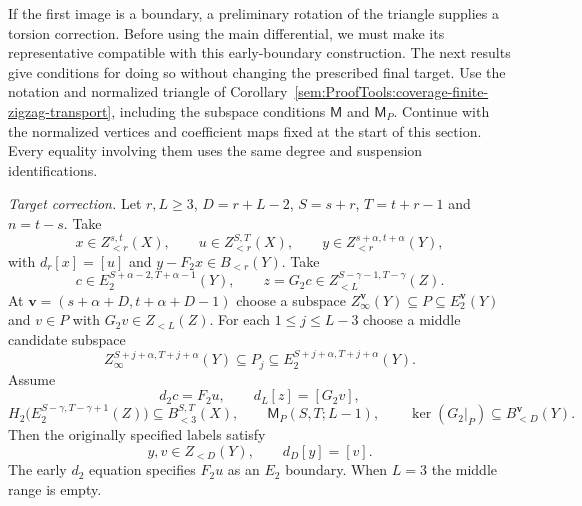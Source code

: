 If the first image is a boundary, a preliminary
rotation of the triangle supplies a torsion correction. Before using
the main differential, we must make its representative compatible
with this early-boundary construction. The next results give conditions
for doing so without changing the prescribed final target.
Use the notation and normalized triangle of
Corollary~\ref{sem:ProofTools:coverage-finite-zigzag-transport}, including
the subspace conditions $\mathsf M$ and $\mathsf M_P$.
Continue with the normalized vertices and coefficient maps fixed at
the start of this section. Every equality involving them uses the same
degree and suspension identifications.

\begin{corollary}
\label{sem:ProofTools:coverage-second-page-boundary-corrections}

\textit{Target correction.}
Let $r,L\ge3$, $D=r+L-2$, $S=s+r$, $T=t+r-1$ and $n=t-s$.
Take
\[
x\in Z_{<r}^{s,t}(X),\qquad u\in Z_{<r}^{S,T}(X),\qquad
 y\in Z_{<r}^{s+\alpha,t+\alpha}(Y),
\]
with $d_r[x]=[u]$ and $y-F_2x\in B_{<r}(Y)$.
Take
\[
c\in E_2^{S+\alpha-2,T+\alpha-1}(Y),\qquad
z=G_2c\in Z_{<L}^{S-\gamma-1,T-\gamma}(Z).
\]
At $\mathbf v=(s+\alpha+D,t+\alpha+D-1)$ choose a subspace
$Z_\infty^{\mathbf v}(Y)\subseteq P\subseteq E_2^{\mathbf v}(Y)$
and $v\in P$ with $G_2v\in Z_{<L}(Z)$. For each $1\le j\le L-3$
choose a middle candidate subspace
\[
Z_\infty^{S+j+\alpha,T+j+\alpha}(Y)\subseteq P_j
 \subseteq E_2^{S+j+\alpha,T+j+\alpha}(Y).
\]
Assume
\[
d_2c=F_2u,\qquad d_L[z]=[G_2v],
\]
\[
H_2\bigl(E_2^{S-\gamma,T-\gamma+1}(Z)\bigr)
 \subseteq B_{<3}^{S,T}(X),\qquad
\mathsf M_P(S,T;L-1),\qquad
\ker(G_2|_P)\subseteq B_{<D}^{\mathbf v}(Y).
\]
Then the originally specified labels satisfy
\[
y,v\in Z_{<D}(Y),\qquad d_D[y]=[v].
\]
The early $d_2$ equation specifies $F_2u$ as an $E_2$ boundary. When $L=3$ the middle range is empty.


\end{corollary}
